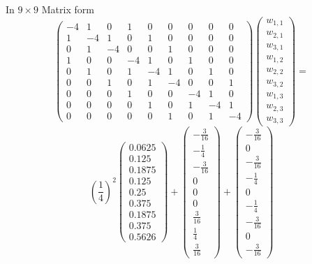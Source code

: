 In $9\times 9$ Matrix form
\[\left(\begin{array}{ccccccccc}
-4& 1 & 0 &1 &0 &0 &0 &0 &0\\
1&-4& 1 & 0 &1 &0 &0 &0 &0 \\
0 &1&-4&  0&0 &1 &0 &0 &0 \\
1 &0 &0 &-4& 1 & 0 &1 &0 &0\\
0 & 1 &0 &1&-4& 1 &0 &1 &0  \\
0 &0 &1 &0 &1&-4&0&  0 &1  \\
0&0&0&1 &0 &0 &-4& 1 & 0\\
0&0&0&0 & 1 &0 &1&-4& 1   \\
0&0&0&0 &0 &1 &0 &1&-4
\end{array}\right)
\left(\begin{array}{c}
w_{1,1}\\
w_{2,1}\\
w_{3,1}\\
w_{1,2}\\
w_{2,2}\\
w_{3,2}\\
w_{1,3}\\
w_{2,3}\\
w_{3,3}
\end{array}\right)=\]
\[
\left(\frac{1}{4}\right)^2\left(\begin{array}{c}
0.0625\\
0.125\\
0.1875 \\
0.125\\
 0.25\\
0.375\\
0.1875\\
0.375\\
0.5626
\end{array}\right)
+\left(\begin{array}{c}
-\frac{3}{16}\\
-\frac{1}{4}\\
-\frac{3}{16}\\
0\\
0\\
0\\
\frac{3}{16}\\
\frac{1}{4}\\
\frac{3}{16}
\end{array}\right)
+\left(\begin{array}{c}
-\frac{3}{16}\\
0\\
-\frac{3}{16}\\
-\frac{1}{4}\\
0\\
-\frac{1}{4}\\
-\frac{3}{16}\\
0\\
-\frac{3}{16}
\end{array}\right)
\]	

